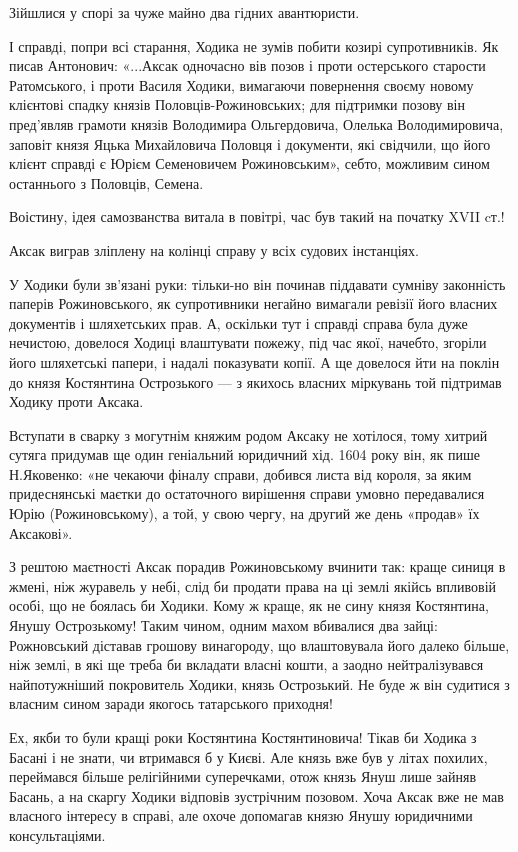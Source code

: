 Зійшлися у спорі за чуже майно два гідних авантюристи. 

І справді, попри всі старання, Ходика не зумів побити козирі супротивників. Як
писав Антонович: «...Аксак одночасно вів позов і проти остерського старости
Ратомського, і проти Василя Ходики, вимагаючи повернення своєму новому
клієнтові спадку князів Половців-Рожиновських; для підтримки позову він
пред’являв грамоти князів Володимира Ольгердовича, Олелька Володимировича,
заповіт князя Яцька Михайловича Половця і документи, які свідчили, що його
клієнт справді є Юрієм Семеновичем Рожиновським», себто, можливим сином
останнього з Половців, Семена. 

Воістину, ідея самозванства витала в повітрі, час був такий на початку XVII
cт.! 

Аксак виграв зліплену на колінці справу у всіх судових інстанціях. 

У Ходики були зв’язані руки: тільки-но він починав піддавати сумніву законність
паперів Рожиновського, як супротивники негайно вимагали ревізії його власних
документів і шляхетських прав. А, оскільки тут і справді справа була дуже
нечистою, довелося Ходиці влаштувати пожежу, під час якої, начебто, згоріли
його шляхетські папери, і надалі показувати копії. А ще довелося йти на поклін
до князя Костянтина Острозького — з якихось власних міркувань той підтримав
Ходику проти Аксака.

Вступати в сварку з могутнім княжим родом Аксаку не хотілося, тому хитрий
сутяга придумав ще один геніальний юридичний хід. 1604 року він, як пише
Н.Яковенко: «не чекаючи фіналу справи, добився листа від короля, за яким
придеснянські маєтки до остаточного вирішення справи умовно передавалися Юрію
(Рожиновському), а той, у свою чергу, на другий же день «продав» їх Аксакові». 

З рештою маєтності Аксак порадив Рожиновському вчинити так: краще синиця в
жмені, ніж журавель у небі, слід би продати права на ці землі якійсь впливовій
особі, що не боялась би Ходики. Кому ж краще, як не сину князя Костянтина,
Янушу Острозькому! Таким чином, одним махом вбивалися два зайці: Рожновський
діставав грошову винагороду, що влаштовувала його далеко більше, ніж землі, в
які ще треба би вкладати власні кошти, а заодно нейтралізувався найпотужніший
покровитель Ходики, князь Острозький. Не буде ж він судитися з власним сином
заради якогось татарського приходня!

Ех, якби то були кращі роки Костянтина Костянтиновича! Тікав би Ходика з Басані
і не знати, чи втримався б у Києві. Але князь вже був у літах похилих,
переймався більше релігійними суперечками, отож князь Януш лише зайняв Басань,
а на скаргу Ходики відповів зустрічним позовом. Хоча Аксак вже не мав власного
інтересу в справі, але охоче допомагав князю Янушу юридичними консультаціями. 

